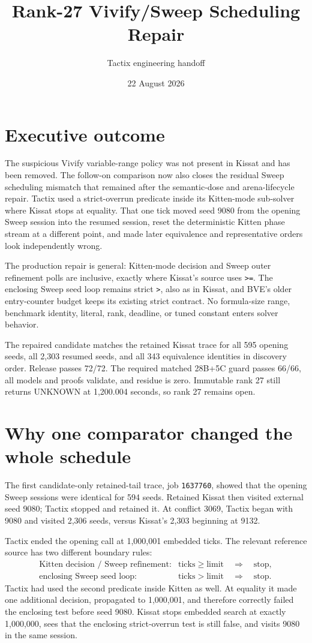 \documentclass[11pt]{article}
\title{Rank-27 Vivify/Sweep Scheduling Repair}
\author{Tactix engineering handoff}
\date{22 August 2026}
\newcommand{\code}[1]{\texttt{#1}}
\begin{document}
\maketitle

\section*{Executive outcome}
The suspicious Vivify variable-range policy was not present in Kissat and has
been removed.  The follow-on comparison now also closes the residual Sweep
scheduling mismatch that remained after the semantic-dose and arena-lifecycle
repair.  Tactix used a strict-overrun predicate inside its Kitten-mode
sub-solver where Kissat stops at equality.  That one tick moved seed 9080 from
the opening Sweep session into the resumed session, reset the deterministic
Kitten phase stream at a different point, and made later equivalence and
representative orders look independently wrong.

The production repair is general: Kitten-mode decision and Sweep outer
refinement polls are inclusive, exactly where Kissat's source uses
\code{>=}.  The enclosing Sweep seed loop remains strict \code{>}, also as in
Kissat, and BVE's older entry-counter budget keeps its existing strict contract.
No formula-size range, benchmark identity, literal, rank, deadline, or tuned
constant enters solver behavior.

The repaired candidate matches the retained Kissat trace for all 595 opening
seeds, all 2,303 resumed seeds, and all 343 equivalence identities in discovery
order.  Release passes 72/72.  The required matched 28B+5C guard passes 66/66,
all models and proofs validate, and residue is zero.  Immutable rank 27 still
returns UNKNOWN at 1,200.004 seconds, so rank 27 remains open.

\section*{Why one comparator changed the whole schedule}
The first candidate-only retained-tail trace, job \code{1637760}, showed that
the opening Sweep sessions were identical for 594 seeds.  Retained Kissat then
visited external seed 9080; Tactix stopped and retained it.  At conflict 3069,
Tactix began with 9080 and visited 2,306 seeds, versus Kissat's 2,303 beginning
at 9132.

Tactix ended the opening call at 1,000,001 embedded ticks.  The relevant
reference source has two different boundary rules:
\[
\begin{array}{ll}
\text{Kitten decision / Sweep refinement:} & \mathrm{ticks}\geq\mathrm{limit}
\quad\Rightarrow\quad\text{stop},\\
\text{enclosing Sweep seed loop:} & \mathrm{ticks}>\mathrm{limit}
\quad\Rightarrow\quad\text{stop}.
\end{array}
\]
Tactix had used the second predicate inside Kitten as well.  At equality it
made one additional decision, propagated to 1,000,001, and therefore correctly
failed the enclosing test before seed 9080.  Kissat stops embedded search at
exactly 1,000,000, sees that the enclosing strict-overrun test is still false,
and visits 9080 in the same session.
\end{document}

